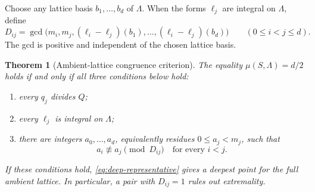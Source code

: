 \documentclass[11pt,a4paper]{article}
\newtheorem{theorem}{Theorem}[section]
\theoremstyle{remark}\newtheorem{remark}[theorem]{Remark}
\begin{document}
Choose any lattice basis $b_1,\ldots,b_d$ of $\Lambda$. When the
forms $\ell_j$ are integral on $\Lambda$, define
\begin{equation}\label{eq:Dij}
 D_{ij}=\gcd\bigl(m_i,m_j,
       (\ell_i-\ell_j)(b_1),\ldots,(\ell_i-\ell_j)(b_d)\bigr)
       \qquad(0\le i<j\le d).
\end{equation}
The gcd is positive and independent of the chosen lattice basis.

\begin{theorem}[Ambient-lattice congruence criterion]\label{eq:main}
The equality $\mu(S,\Lambda)=d/2$ holds if and only if all three
conditions below hold:
\begin{enumerate}
\item every $q_j$ divides $Q$;
\item every $\ell_j$ is integral on $\Lambda$;
\item there are integers $a_0,\ldots,a_d$, equivalently residues
      $0\le a_j<m_j$, such that
\begin{equation}\label{eq:avoid}
       a_i\not\equiv a_j\pmod{D_{ij}}
       \quad\text{for every }i<j.
\end{equation}
\end{enumerate}
If these conditions hold, \eqref{eq:deep-representative} gives a
deepest point for the full ambient lattice. In particular, a pair
with $D_{ij}=1$ rules out extremality.
\end{theorem}
\end{document}
